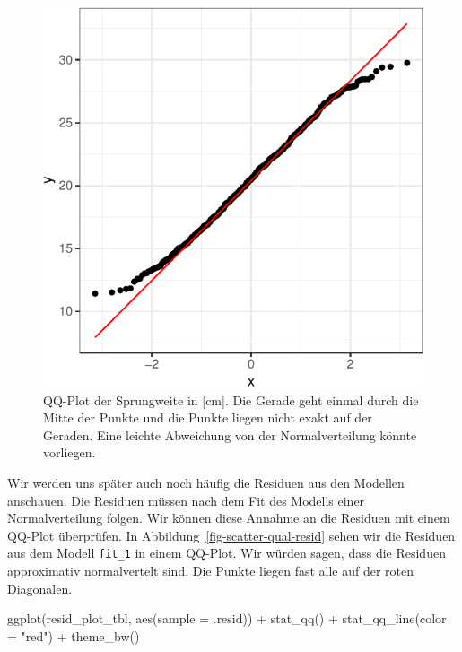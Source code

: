 \documentclass[
  letterpaper,
]{scrbook}
\newenvironment{Shaded}{\begin{snugshade}}{\end{snugshade}}
\newcommand{\AttributeTok}[1]{\textcolor[rgb]{0.40,0.45,0.13}{#1}}
\newcommand{\FunctionTok}[1]{\textcolor[rgb]{0.28,0.35,0.67}{#1}}
\newcommand{\NormalTok}[1]{\textcolor[rgb]{0.00,0.23,0.31}{#1}}
\newcommand{\SpecialCharTok}[1]{\textcolor[rgb]{0.37,0.37,0.37}{#1}}
\newcommand{\StringTok}[1]{\textcolor[rgb]{0.13,0.47,0.30}{#1}}
\begin{document}
\begin{figure}[H]

{\centering \includegraphics{./stat-linear-reg-quality_files/figure-pdf/fig-scatter-qual-02-1.pdf}

}

\caption{\label{fig-scatter-qual-02}QQ-Plot der Sprungweite in {[}cm{]}.
Die Gerade geht einmal durch die Mitte der Punkte und die Punkte liegen
nicht exakt auf der Geraden. Eine leichte Abweichung von der
Normalverteilung könnte vorliegen.}

\end{figure}

Wir werden uns später auch noch häufig die Residuen aus den Modellen
anschauen. Die Residuen müssen nach dem Fit des Modells einer
Normalverteilung folgen. Wir können diese Annahme an die Residuen mit
einem QQ-Plot überprüfen. In Abbildung~\ref{fig-scatter-qual-resid}
sehen wir die Residuen aus dem Modell \texttt{fit\_1} in einem QQ-Plot.
Wir würden sagen, dass die Residuen approximativ normalvertelt sind. Die
Punkte liegen fast alle auf der roten Diagonalen.

\begin{Shaded}
\begin{Highlighting}[]
\FunctionTok{ggplot}\NormalTok{(resid\_plot\_tbl, }\FunctionTok{aes}\NormalTok{(}\AttributeTok{sample =}\NormalTok{ .resid)) }\SpecialCharTok{+} 
  \FunctionTok{stat\_qq}\NormalTok{() }\SpecialCharTok{+} 
  \FunctionTok{stat\_qq\_line}\NormalTok{(}\AttributeTok{color =} \StringTok{"red"}\NormalTok{) }\SpecialCharTok{+}
  \FunctionTok{theme\_bw}\NormalTok{() }
\end{Highlighting}
\end{Shaded}
\end{document}
